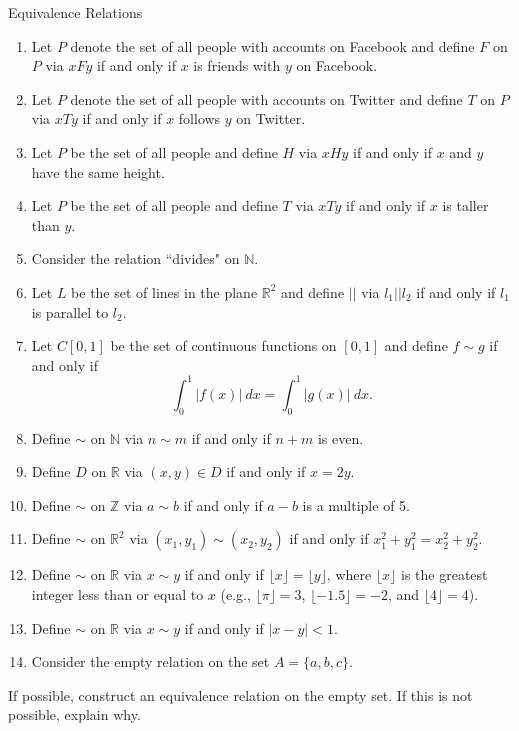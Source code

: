 \begin{section}{Equivalence Relations}
\begin{exercise}
\begin{enumerate}[label=\textrm{(\alph*)}]
\item\label{exer:facebook} Let $P$ denote the set of all people with accounts on Facebook and define $F$ on $P$ via $xFy$ if and only if $x$ is friends with $y$ on Facebook. 
\item\label{exer:twitter} Let $P$ denote the set of all people with accounts on Twitter and define $T$ on $P$ via $xTy$ if and only if $x$ follows $y$ on Twitter. 
\item Let $P$ be the set of all people and define $H$ via $xHy$ if and only if $x$ and $y$ have the same height.
\item Let $P$ be the set of all people and define $T$ via $xTy$ if and only if $x$ is taller than $y$.
\item Consider the relation ``divides" on $\mathbb{N}$.
\item Let $L$ be the set of lines in the plane $\mathbb{R}^2$ and define $||$ via $l_1||l_2$ if and only if $l_1$ is parallel to $l_2$.
\item Let $C[0,1]$ be the set of continuous functions on $[0,1]$ and define $f\sim g$ if and only if
\[
\int_0^1|f(x)|\ dx=\int_0^1|g(x)|\ dx.
\]
\item Define $\sim$ on $\mathbb{N}$ via $n\sim m$ if and only if $n+m$ is even.
\item Define $D$ on $\mathbb{R}$ via $(x,y)\in D$ if and only if $x=2y$.
\item\label{exer:mod 5} Define $\sim$ on $\mathbb{Z}$ via $a\sim b$ if and only if $a-b$ is a multiple of 5.
\item Define $\sim$ on $\mathbb{R}^2$ via $(x_1,y_1)\sim (x_2,y_2)$ if and only if $x_1^2+y_1^2=x_2^2+y_2^2$.
\item Define $\sim$ on $\mathbb{R}$ via $x\sim y$ if and only if $\lfloor x\rfloor =\lfloor y\rfloor$, where $\lfloor x\rfloor$ is the greatest integer less than or equal to $x$ (e.g., $\lfloor \pi\rfloor=3$, $\lfloor -1.5\rfloor=-2$, and $\lfloor 4\rfloor=4$).
\item Define $\sim$ on $\mathbb{R}$ via $x \sim y$ if and only if $|x-y|<1$.
\item Consider the empty relation on the set $A=\{a,b,c\}$.
\end{enumerate}
\end{exercise}

\begin{problem}
If possible, construct an equivalence relation on the empty set.  If this is not possible, explain why.
\end{problem}


\end{section}
